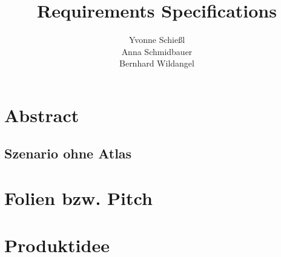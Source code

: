 \documentclass[a4paper, 12pp]{article}
\title{\textbf{Requirements Specifications}}
\author{ Yvonne Schießl \\
		Anna Schmidbauer\\
		Bernhard Wildangel}
\date{}
\begin{document}
\maketitle
\tableofcontents
\newpage
\section{Abstract}
\subsection{Szenario ohne Atlas}

\section{Folien bzw. Pitch}

\begin{figure}[H] 
\centering
	\fbox{\begin{minipage}{13cm} 
	\end{minipage}}

	\vspace{0.3cm}

	\fbox{\begin{minipage}{13cm}  
	\end{minipage}}

	\vspace{0.3cm}

	\fbox{\begin{minipage}{13cm} 
	\end{minipage}}
	
\end{figure}

\section{Produktidee}
\end{document}
